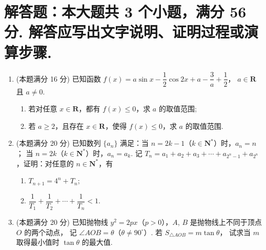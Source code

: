 \documentclass{chsmc}
\begin{document}
\section{解答题：本大题共 3 个小题，满分 56 分. 解答应写出文字说明、证明过程或演算步骤.}

\begin{enumerate}[resume]
	\item (本题满分 16 分) 已知函数
		$f(x) = a\sin x - \dfrac{1}{2}\cos 2x + a - \dfrac{3}{a} + \dfrac{1}{2}$，
		$a \in \mathbf{R}$ 且 $a \neq 0$.
    \begin{enumerate}[(1)]
      \item 若对任意 $x \in \mathbf{R}$，都有 $f(x) \leqslant 0$，求 $a$ 的取值范围;
      \item 若 $a \geqslant 2$，且存在 $x \in \mathbf{R}$，使得 $f(x) \leqslant 0$，求 $a$ 的取值范围.
    \end{enumerate}
	\item (本题满分 20 分) 已知数列 $\{a_n\}$ 满足：当 $n = 2k - 1$（$k \in \mathbf{N}^*$）时，$a_n = n$；
		当 $n = 2k$（$k \in \mathbf{N}^*$）时，$a_n = a_k$. 记
		$T_n = a_1 + a_2 + a_3 + \cdots + a_{2^n-1} + a_{2^n}$，证明：对任意的 $n \in \mathbf{N}^*$，有
    \begin{enumerate}[(1)]
      \item $T_{n+1} = 4^n + T_n$;
      \item $\dfrac{1}{T_1} + \dfrac{1}{T_2} + \cdots + \dfrac{1}{T_n} < 1$.
    \end{enumerate}
	\item (本题满分 20 分) 已知抛物线 $y^2 = 2px$（$p > 0$），$A$, $B$ 是抛物线上不同于顶点 $O$ 的两个动点，
		记 $\angle AOB = \theta$（$\theta \neq 90^\circ$）. 若 $S_{\triangle AOB} = m\tan\theta$，
		试求当 $m$ 取得最小值时 $\tan\theta$ 的最大值.
\end{enumerate}
\end{document}
